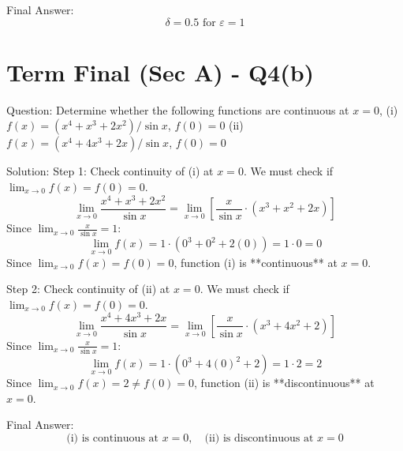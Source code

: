 \documentclass[11pt, a4paper]{article}
\begin{document}
Final Answer:
$$
\boxed{\delta = 0.5 \text{ for } \varepsilon = 1}
$$


\section*{Term Final (Sec A) - Q4(b)}
Question:
Determine whether the following functions are continuous at $x = 0$,
(i) $f(x) = (x^4 + x^3 + 2x^2)/\sin x$, $f(0) = 0$
(ii) $f(x) = (x^4 + 4x^3 + 2x)/\sin x$, $f(0) = 0$

Solution:
Step 1: Check continuity of (i) at $x = 0$.
We must check if $\lim_{x \to 0} f(x) = f(0) = 0$.
$$\lim_{x \to 0} \frac{x^4 + x^3 + 2x^2}{\sin x} = \lim_{x \to 0} \left[ \frac{x}{\sin x} \cdot (x^3 + x^2 + 2x) \right]$$
Since $\lim_{x \to 0} \frac{x}{\sin x} = 1$:
$$\lim_{x \to 0} f(x) = 1 \cdot (0^3 + 0^2 + 2(0)) = 1 \cdot 0 = 0$$
Since $\lim_{x \to 0} f(x) = f(0) = 0$, function (i) is **continuous** at $x = 0$.

Step 2: Check continuity of (ii) at $x = 0$.
We must check if $\lim_{x \to 0} f(x) = f(0) = 0$.
$$\lim_{x \to 0} \frac{x^4 + 4x^3 + 2x}{\sin x} = \lim_{x \to 0} \left[ \frac{x}{\sin x} \cdot (x^3 + 4x^2 + 2) \right]$$
Since $\lim_{x \to 0} \frac{x}{\sin x} = 1$:
$$\lim_{x \to 0} f(x) = 1 \cdot (0^3 + 4(0)^2 + 2) = 1 \cdot 2 = 2$$
Since $\lim_{x \to 0} f(x) = 2 \neq f(0) = 0$, function (ii) is **discontinuous** at $x = 0$.

Final Answer:
$$
\boxed{\text{(i) is continuous at } x = 0, \quad \text{(ii) is discontinuous at } x = 0}
$$
\end{document}
